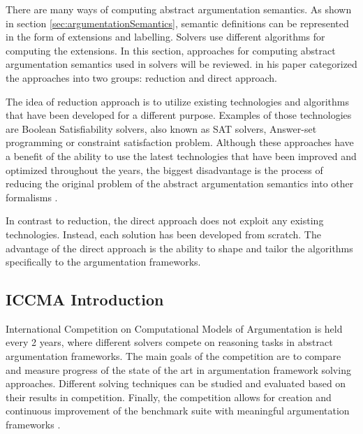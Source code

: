 There are many ways of computing abstract argumentation semantics. As shown in section \ref{sec:argumentationSemantics}, semantic definitions can be represented in the form of extensions and labelling. Solvers use different algorithms for computing the extensions. In this section, approaches for computing abstract argumentation semantics used in solvers will be reviewed. \citet{solvingMethods} in his paper categorized the approaches into two groups: reduction and direct approach.

The idea of reduction approach is to utilize existing technologies and algorithms that have been developed for a different purpose. Examples of those technologies are Boolean Satisfiability solvers, also known as SAT solvers, Answer-set programming or constraint satisfaction problem. Although these approaches have a benefit of the ability to use the latest technologies that have been improved and optimized throughout the years, the biggest disadvantage is the process of reducing the original problem of the abstract argumentation semantics into other formalisms \citep{solvingMethods}.

In contrast to reduction, the direct approach does not exploit any existing technologies. Instead, each solution has been developed from scratch. The advantage of the direct approach is the ability to shape and tailor the algorithms specifically to the argumentation frameworks.

\subsection{ICCMA Introduction}

International Competition on Computational Models of Argumentation is held every 2 years, where different solvers compete on reasoning tasks in abstract argumentation frameworks. The main goals of the competition are to compare and measure progress of the state of the art in argumentation framework solving approaches. Different solving techniques can be studied and evaluated based on their results in competition. Finally, the competition allows for creation and continuous improvement of the benchmark suite with meaningful argumentation frameworks \citep{results_sildes}.

